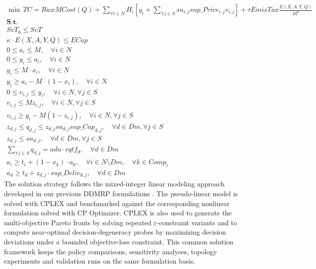 \documentclass[preprint,12pt,authoryear]{elsarticle}
\begin{document}
\begin{gather}
    \min \, TC = RawMCost(Q)+\sum_{\forall i\in N}H_i\left[y_i+\sum_{\forall j\in S}su_{i,j}sup\_Price_{i,j}v_{i,j}\right]+\tau EmisTax\frac{E(X,A,Y,Q)}{10^{6}}\\
\nonumber \textbf{S.t.}\\
    SvT_{0} \leq SvT\\
    \kappa \cdot E(X,A,Y,Q) \leq ECap\\
    0 \leq a_i \leq M,\quad \forall i \in N\\
    0 \leq y_{i} \leq a_i,\quad \forall i \in N\\
    y_{i} \leq M \cdot x_{i},\quad \forall i \in N\\
    y_{i} \geq a_{i}- M \cdot (1-x_{i}),\quad \forall i \in N\\
    0 \leq v_{i,j}\leq y_i,\quad \forall i\in N,\forall j\in S\\
    v_{i,j}\leq Mz_{i,j},\quad \forall i\in N,\forall j\in S\\
    v_{i,j}\geq y_i-M(1-z_{i,j}),\quad \forall i\in N,\forall j\in S\\
    z_{d,j}\leq q_{d,j}\leq z_{d,j}su_{d,j}sup\_Cap_{d,j},\quad \forall d\in Dm,\forall j\in S\\
    z_{d,j}\leq su_{d,j},\quad \forall d\in Dm,\forall j\in S\\
    \sum_{\forall j \in S}q_{d,j} = adu \cdot rqtf_{d},\quad \forall d\in Dm\\
    a_{i} \geq t_{i} + (1-x_{k}) \cdot a_{k}, \quad \forall i \in N\setminus Dm, \quad \forall k \in Comp_{i}\\
    a_{d} \geq t_{d} + z_{d,j}\cdot sup\_Deliv_{d,j}, \quad \forall d \in Dm
\end{gather}
The solution strategy follows the mixed-integer linear modeling approach developed in our previous DDMRP formulations \cite{achergui2,ACHERGUI4}. The pseudo-linear model is solved with CPLEX and benchmarked against the corresponding nonlinear formulation solved with CP Optimizer. CPLEX is also used to generate the multi-objective Pareto fronts by solving repeated $\varepsilon$-constraint variants and to compute near-optimal decision-degeneracy probes by maximizing decision deviations under a bounded objective-loss constraint. This common solution framework keeps the policy comparisons, sensitivity analyses, topology experiments and validation runs on the same formulation basis.
\end{document}
